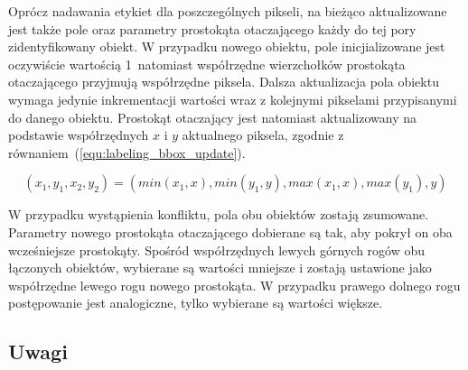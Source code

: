 Oprócz nadawania etykiet dla poszczególnych pikseli, na bieżąco aktualizowane jest także pole oraz parametry prostokąta otaczającego każdy do tej pory zidentyfikowany obiekt. %
W przypadku nowego obiektu, pole inicjializowane jest oczywiście wartością 1~natomiast współrzędne wierzchołków prostokąta otaczającego przyjmują współrzędne piksela. %
Dalsza aktualizacja pola obiektu wymaga jedynie inkrementacji wartości wraz z kolejnymi pikselami przypisanymi do danego obiektu. Prostokąt otaczający jest natomiast aktualizowany na podstawie współrzędnych $x$ i $y$ aktualnego piksela, zgodnie z równaniem~(\ref{equ:labeling_bbox_update}). %

    \begin{equation}
        (x_{1}, y_{1}, x_{2}, y_{2})= (min(x_{1}, x), min(y_{1}, y), max(x_{1}, x), max(y_{1}), y)
    \label{equ:labeling_bbox_update}
    \end{equation}

\noindent
W przypadku wystąpienia konfliktu, pola obu obiektów zostają zsumowane. Parametry nowego prostokąta otaczającego dobierane są tak, aby pokrył on oba wcześniejsze prostokąty. Spośród współrzędnych lewych górnych rogów obu łączonych obiektów, wybierane są wartości mniejsze i zostają ustawione jako współrzędne lewego rogu nowego prostokąta. W przypadku prawego dolnego rogu postępowanie jest analogiczne, tylko wybierane są wartości większe.


\subsection{Uwagi}
\label{subsec:pbas_uwagi}


